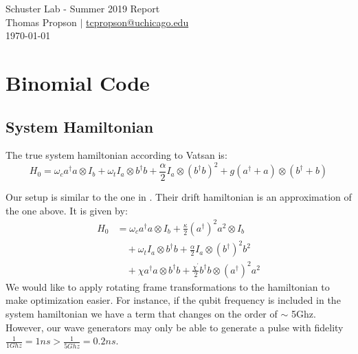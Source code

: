 \documentclass[letterpaper, 12pt]{article}
\begin{document}
\begin{center}
  {\huge Schuster Lab - Summer 2019 Report} \\[0.5em]
  {\large Thomas Propson $\vert$ \href{mailto:tcpropson@uchicago.edu}
    {tcpropson@uchicago.edu} \\[0.5em] \today}
\end{center}

\section{Binomial Code}
\subsection{System Hamiltonian}
The true system hamiltonian according to Vatsan is:
\[
H_{0} = \omega_{c} a^{\dagger} a \otimes I_{b}+ \omega_{t} I_{a} \otimes b^{\dagger} b +
\frac{\alpha}{2} I_{a} \otimes (b^{\dagger} b)^{2} + g (a^{\dagger} + a) \otimes (b^{\dagger} + b)
\]


Our setup is similar to the one in \cite{sun2014tracking}.
Their drift hamiltonian is an approximation of the one above.
It is given by:
\begin{align*}
  H_{0} &= \omega_{c}a^{\dagger}a \otimes I_{b} + \frac{\kappa}{2}(a^{\dagger})^{2}a^{2} \otimes I_{b}\\
  &\quad + \omega_{t} I_{a} \otimes b^{\dagger}b + \frac{\alpha}{2} I_{a} \otimes (b^{\dagger})^{2}b^{2} \\
  &\quad + \chi a^{\dagger}a \otimes b^{\dagger}b + \frac{\chi^{'}}{2}b^{\dagger}b \otimes (a^{\dagger})^{2}a^{2}
\end{align*}
We would like to apply rotating frame transformations to the hamiltonian to make optimization easier. For instance, if the qubit frequency is included in the system hamiltonian we have a term that changes on the order of $\sim$ 5Ghz. However, our wave generators may only be able to generate a pulse with fidelity $\frac{1}{1 Ghz} = 1 ns > \frac{1}{5 Ghz} = 0.2 ns$.
\end{document}
